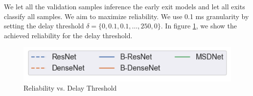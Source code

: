 We let all the validation samples inference the early exit models and let all exits classify all samples.  We aim to maximize reliability. We use 0.1 ms granularity by setting the delay threshold $\delta = \{0,0.1,0.1, \dots, 250,0\}$. In figure \ref{fig:delay-threshold}, we show the achieved reliability for the delay threshold. 
\begin{figure}
	\captionsetup[subfigure]{justification=centering, farskip=0pt,captionskip=0pt}
	\centering
	\includegraphics[height=.05\textheight]{figures/delay_plots/delay_threshold_legend}
	\hfill
	\hfill
	\hfill
	\caption[Reliability vs. Computation Latency]{Reliability vs. Delay Threshold}
	\label{fig:delay-threshold}
\end{figure}
